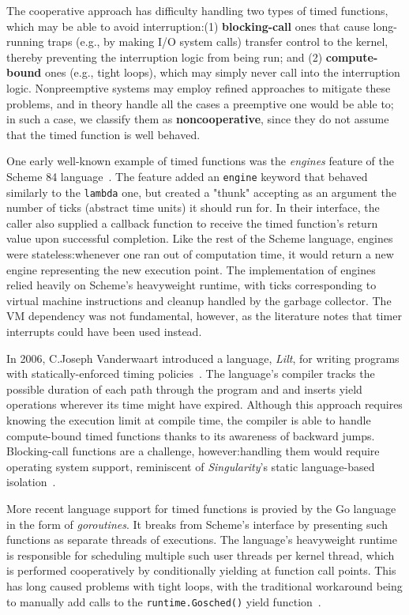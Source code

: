 The cooperative approach has difficulty handling two types of timed functions, which
may be able to avoid interruption:\@ (1) \textbf{blocking-call} ones that cause
long-running traps (e.g., by making I/O system calls) transfer control to the kernel,
thereby preventing the interruption logic from being run; and (2)
\textbf{compute-bound} ones (e.g., tight loops), which may simply never call into the
interruption logic.  Nonpreemptive systems may employ refined approaches to mitigate
these problems, and in theory handle all the cases a preemptive one would be able to;
in such a case, we classify them as \textbf{noncooperative}, since they do not assume
that the timed function is well behaved.

One early well-known example of timed functions was the \textit{engines} feature of
the Scheme 84 language~\cite{haynes:iucs1984}.  The feature added an \texttt{engine}
keyword that behaved similarly to the \texttt{lambda} one, but created a "thunk"
accepting as an argument the number of ticks (abstract time units) it should run for.
In their interface, the caller also supplied a callback function to receive the
timed function's return value upon successful completion.  Like the rest of the
Scheme language, engines were stateless:\@ whenever one ran out of computation time,
it would return a new engine representing the new execution point.  The
implementation of engines relied heavily on Scheme's heavyweight runtime, with ticks
corresponding to virtual machine instructions and cleanup handled by the garbage
collector.  The VM dependency was not fundamental, however, as the literature notes
that timer interrupts could have been used instead.

In 2006, C.\@ Joseph Vanderwaart introduced a language, \textit{Lilt}, for writing
programs with statically-enforced timing policies~\cite{vanderwaart:cmucs2006}.  The
language's compiler tracks the possible duration of each path through the program and
and inserts yield operations wherever its time might have expired.  Although this
approach requires knowing the execution limit at compile time, the compiler is able
to handle compute-bound timed functions thanks to its awareness of backward jumps.
Blocking-call functions are a challenge, however:\@ handling them would require
operating system support, reminiscent of \textit{Singularity}'s static language-based
isolation~\cite{hunt:msr2005}.

More recent language support for timed functions is provied by the Go
language~\cite{www-golang} in the form of \textit{goroutines}.  It breaks from
Scheme's interface by presenting such functions as separate threads of executions.
The language's heavyweight runtime is responsible for scheduling multiple such user
threads per kernel thread, which is performed cooperatively by conditionally yielding
at function call points.  This has long caused problems with tight loops, with the
traditional workaround being to manually add calls to the \texttt{runtime.Gosched()}
yield function~\cite{www-golang-tightloop}.

